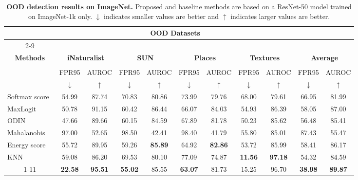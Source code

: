 \documentclass[nohyperref]{article}
\theoremstyle{plain}
\theoremstyle{definition}
\theoremstyle{remark}
\newcommand{\shortname}{CTM}
\begin{document}
\begin{table}[ht!]
\centering
\caption{\textbf{OOD detection results on ImageNet.} Proposed and baseline methods are based on a ResNet-50 \cite{he2016deep} model trained on ImageNet-1k \cite{deng2009imagenet} only. $\downarrow$ indicates smaller values are better and $\uparrow$ indicates larger values are better.}
\label{tab:imagenet_result}
\resizebox{1.0\textwidth}{!}
{
    \begin{tabular}{c c c c c c c c c c c}
    \hline
     & \multicolumn{8}{c}{\textbf{OOD Datasets}} & & \\
    \cline{2-9} \\
    \textbf{Methods} & \multicolumn{2}{c}{\textbf{iNaturalist}} & \multicolumn{2}{c}{\textbf{SUN}} & \multicolumn{2}{c}{\textbf{Places}} & \multicolumn{2}{c}{\textbf{Textures}} & \multicolumn{2}{c}{\textbf{Average}} \\
    & & & & & & & & & & \\
    & FPR95 & AUROC & FPR95 & AUROC & FPR95 & AUROC & FPR95 & AUROC & FPR95 & AUROC \\
    & $\downarrow$ & $\uparrow$ & $\downarrow$ & $\uparrow$ & $\downarrow$ & $\uparrow$ & $\downarrow$ & $\uparrow$ & $\downarrow$ & $\uparrow$ \\
    \midrule
    \multicolumn{1}{l}{Softmax score~\cite{hendrycks17baseline}} & 54.99 & 87.74 & 70.83 & 80.86 & 73.99 & 79.76 & 68.00 & 79.61 & 66.95 & 81.99 \\
    \multicolumn{1}{l}{MaxLogit~\cite{hendrycks2022scaling}} & 50.78 & 91.15 & 60.42 & 86.44 & 66.07 & 84.03 & 54.93 & 86.39 & 58.05 & 87.00 \\
    \multicolumn{1}{l}{ODIN~\cite{Liang2017}} & 47.66 & 89.66 & 60.15 & 84.59 & 67.89 & 81.78 & 50.23 & 85.62 & 56.48 & 85.41 \\
    \multicolumn{1}{l}{Mahalanobis~\cite{mahalanobis}} & 97.00 & 52.65 & 98.50 & 42.41 & 98.40 & 41.79 & 55.80 & 85.01 & 87.43 & 55.47 \\
    \multicolumn{1}{l}{Energy score~\cite{liu2020energy}} & 55.72 & 89.95 & 59.26 & \textbf{85.89} & 64.92 & \textbf{82.86} & 53.72 & 85.99 & 58.41 & 86.17 \\
    \multicolumn{1}{l}{KNN~\cite{sun2022knn}} & 59.08 & 86.20 & 69.53 & 80.10 & 77.09 & 74.87 & \textbf{11.56} & \textbf{97.18} & 54.32 & 84.59\\
    \cmidrule{1-11}
    \multicolumn{1}{l}{\textbf{\shortname\;(Our)}} & \textbf{22.58} & \textbf{95.51} & \textbf{55.02} & 85.55 & \textbf{63.07} & 81.73 & 15.25 & 96.70 & \textbf{38.98} & \textbf{89.87}\\
    \bottomrule
    \end{tabular}
}
\vspace{0.1in}

\end{table}
\end{document}

